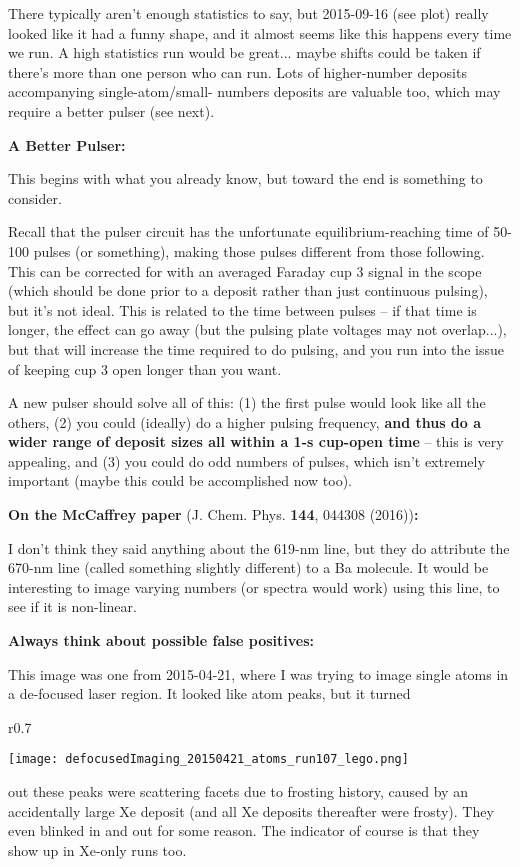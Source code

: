 \documentclass{article}
\begin{document}
There typically aren't enough statistics to say, but 2015-09-16 (see plot) really looked like it had a funny shape, and it almost seems like this happens every time we run.  A high statistics run would be great... maybe shifts could be taken if there's more than one person who can run.  Lots of higher-number deposits accompanying single-atom/small- numbers deposits are valuable too, which may require a better pulser (see next).

\newpage

\noindent
\textbf{A Better Pulser:}

This begins with what you already know, but toward the end is something to consider.

Recall that the pulser circuit has the unfortunate equilibrium-reaching time of 50-100 pulses (or something), making those pulses different from those following.  This can be corrected for with an averaged Faraday cup 3 signal in the scope (which should be done prior to a deposit rather than just continuous pulsing), but it's not ideal.  This is related to the time between pulses -- if that time is longer, the effect can go away (but the pulsing plate voltages may not overlap...), but that will increase the time required to do pulsing, and you run into the issue of keeping cup 3 open longer than you want.

A new pulser should solve all of this:  (1) the first pulse would look like all the others, (2) you could (ideally) do a higher pulsing frequency, \textbf{and thus do a wider range of deposit sizes all within a 1-s cup-open time} -- this is very appealing, and (3) you could do odd numbers of pulses, which isn't extremely important (maybe this could be accomplished now too).

\vspace{5mm}

\noindent
\textbf{On the McCaffrey paper} (J. Chem. Phys. \textbf{144}, 044308 (2016))\textbf{:}

I don't think they said anything about the 619-nm line, but they do attribute the 670-nm line (called something slightly different) to a Ba molecule.  It would be interesting to image varying numbers (or spectra would work) using this line, to see if it is non-linear.

\vspace{5mm}

\noindent
\textbf{Always think about possible false positives:}

This image was one from 2015-04-21, where I was trying to image single atoms in a de-focused laser region.  It looked like atom peaks, but it turned
\begin{wrapfigure}{r}{0.7\textwidth}
  \begin{center}
    \texttt{[image: defocusedImaging\_20150421\_atoms\_run107\_lego.png]}
  \end{center}
\end{wrapfigure}
out these peaks were scattering facets due to frosting history, caused by an accidentally large Xe deposit (and all Xe deposits thereafter were frosty).  They even blinked in and out for some reason.  The indicator of course is that they show up in Xe-only runs too.
\end{document}
